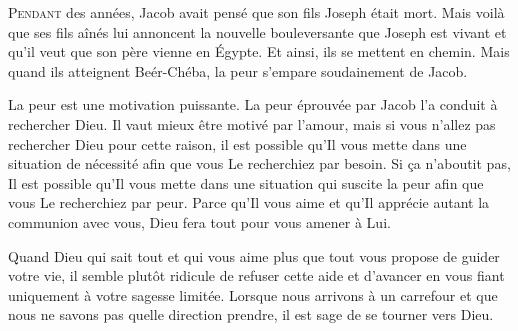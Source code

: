 





\lettrine{P}{endant} des années,
 Jacob avait pensé que son fils Joseph était mort.
 Mais voilà que ses fils aînés lui annoncent la nouvelle bouleversante
 que Joseph est vivant et qu'il veut que son père vienne en Égypte.
 Et ainsi, ils se mettent en chemin.
 Mais quand ils atteignent Beér-Chéba, la peur s'empare soudainement de Jacob. 

La peur est une motivation puissante.
 La peur éprouvée par Jacob l'a conduit à rechercher Dieu.
 Il vaut mieux être motivé par l'amour,
 mais si vous n'allez pas rechercher Dieu pour cette raison,
 il est possible qu'Il vous mette dans une situation de nécessité
 afin que vous Le recherchiez par besoin.
 Si \c{c}a n'aboutit pas, Il est possible qu'Il vous mette
 dans une situation qui suscite la peur afin que vous Le recherchiez par peur.
 Parce qu'Il vous aime et qu'Il apprécie autant la communion avec vous,
 Dieu fera tout pour vous amener à Lui.


Quand Dieu \ocadr{}qui sait tout et qui vous aime plus que tout\fcadr{}
 vous propose de guider votre vie, il semble plutôt ridicule de refuser
 cette aide et d'avancer en vous fiant uniquement à votre sagesse limitée.
 Lorsque nous arrivons à un carrefour et que nous ne savons pas
 quelle direction prendre, il est sage de se tourner vers Dieu. 

\dvrule



